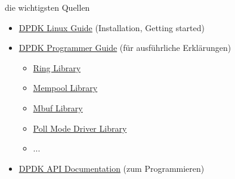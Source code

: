 \documentclass{beamer}
\begin{document}
\begin{frame}{die wichtigsten Quellen}
    \begin{itemize}
        \item \href{http://doc.dpdk.org/guides/linux_gsg/}{DPDK Linux Guide} (Installation, Getting started)
        \item \href{http://doc.dpdk.org/guides/prog_guide/}{DPDK Programmer Guide} (für ausführliche Erklärungen)
              \begin{itemize}
                  \item \href{http://doc.dpdk.org/guides/prog_guide/ring_lib.html}{Ring Library}
                  \item \href{http://doc.dpdk.org/guides/prog_guide/mempool_lib.html}{Mempool Library}
                  \item \href{http://doc.dpdk.org/guides/prog_guide/mbuf_lib.html}{Mbuf Library}
                  \item \href{http://doc.dpdk.org/guides/prog_guide/poll_mode_drv.html}{Poll Mode Driver Library}
                  \item ...
              \end{itemize}
        \item \href{http://doc.dpdk.org/api/}{DPDK API Documentation} (zum Programmieren)
    \end{itemize}
\end{frame}
\end{document}
